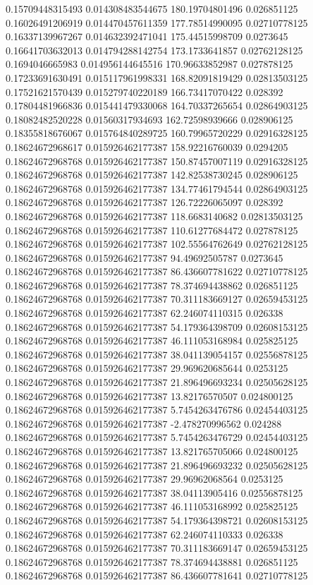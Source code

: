 0.15709448315493 0.014308483544675 180.19704801496 0.026851125
0.16026491206919 0.014470457611359 177.78514990095 0.02710778125
0.16337139967267 0.014632392471041 175.44515998709 0.0273645
0.16641703632013 0.014794288142754 173.1733641857 0.02762128125
0.1694046665983 0.014956144645516 170.96633852987 0.027878125
0.17233691630491 0.015117961998331 168.82091819429 0.02813503125
0.17521621570439 0.015279740220189 166.73417070422 0.028392
0.17804481966836 0.015441479330068 164.70337265654 0.02864903125
0.18082482520228 0.01560317934693 162.72598939666 0.028906125
0.18355818676067 0.015764840289725 160.79965720229 0.02916328125
0.18624672968617 0.015926462177387 158.92216760039 0.0294205
0.18624672968768 0.015926462177387 150.87457007119 0.02916328125
0.18624672968768 0.015926462177387 142.82538730245 0.028906125
0.18624672968768 0.015926462177387 134.77461794544 0.02864903125
0.18624672968768 0.015926462177387 126.72226065097 0.028392
0.18624672968768 0.015926462177387 118.6683140682 0.02813503125
0.18624672968768 0.015926462177387 110.61277684472 0.027878125
0.18624672968768 0.015926462177387 102.55564762649 0.02762128125
0.18624672968768 0.015926462177387 94.49692505787 0.0273645
0.18624672968768 0.015926462177387 86.436607781622 0.02710778125
0.18624672968768 0.015926462177387 78.374694438862 0.026851125
0.18624672968768 0.015926462177387 70.311183669127 0.02659453125
0.18624672968768 0.015926462177387 62.246074110315 0.026338
0.18624672968768 0.015926462177387 54.179364398709 0.02608153125
0.18624672968768 0.015926462177387 46.111053168984 0.025825125
0.18624672968768 0.015926462177387 38.041139054157 0.02556878125
0.18624672968768 0.015926462177387 29.969620685644 0.0253125
0.18624672968768 0.015926462177387 21.896496693234 0.02505628125
0.18624672968768 0.015926462177387 13.82176570507 0.024800125
0.18624672968768 0.015926462177387 5.7454263476786 0.02454403125
0.18624672968768 0.015926462177387 -2.478270996562 0.024288
0.18624672968768 0.015926462177387 5.7454263476729 0.02454403125
0.18624672968768 0.015926462177387 13.821765705066 0.024800125
0.18624672968768 0.015926462177387 21.896496693232 0.02505628125
0.18624672968768 0.015926462177387 29.96962068564 0.0253125
0.18624672968768 0.015926462177387 38.04113905416 0.02556878125
0.18624672968768 0.015926462177387 46.111053168992 0.025825125
0.18624672968768 0.015926462177387 54.179364398721 0.02608153125
0.18624672968768 0.015926462177387 62.246074110333 0.026338
0.18624672968768 0.015926462177387 70.311183669147 0.02659453125
0.18624672968768 0.015926462177387 78.374694438881 0.026851125
0.18624672968768 0.015926462177387 86.436607781641 0.02710778125
